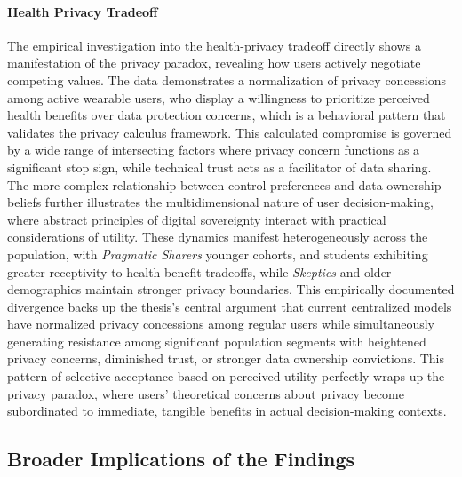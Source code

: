 	\paragraph{Health Privacy Tradeoff}
	The empirical investigation into the health-privacy tradeoff directly shows a manifestation of the privacy paradox, revealing how users actively negotiate competing values. The data demonstrates a normalization of privacy concessions among active wearable users, who display a willingness to prioritize perceived health benefits over data protection concerns, which is a behavioral pattern that validates the privacy calculus framework. This calculated compromise is governed by a wide range of intersecting factors where privacy concern functions as a significant stop sign, while technical trust acts as a facilitator of data sharing. The more complex relationship between control preferences and data ownership beliefs further illustrates the multidimensional nature of user decision-making, where abstract principles of digital sovereignty interact with practical considerations of utility. These dynamics manifest heterogeneously across the population, with \textit{Pragmatic Sharers} younger cohorts, and students exhibiting greater receptivity to health-benefit tradeoffs, while \textit{Skeptics} and older demographics maintain stronger privacy boundaries. This empirically documented divergence backs up the thesis's central argument that current centralized models have normalized privacy concessions among regular users while simultaneously generating resistance among significant population segments with heightened privacy concerns, diminished trust, or stronger data ownership convictions. This pattern of selective acceptance based on perceived utility perfectly wraps up the privacy paradox, where users' theoretical concerns about privacy become subordinated to immediate, tangible benefits in actual decision-making contexts.
\subsection{Broader Implications of the Findings}
